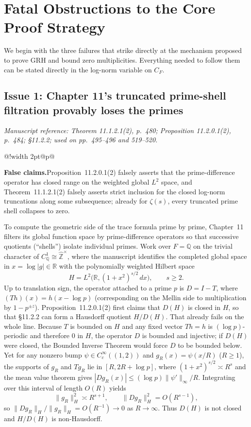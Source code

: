 \documentclass[11pt,letterpaper]{article}
\makeatletter
\newcommand{\msloc}[1]{%
  {\small\color{locgray}\itshape Manuscript reference: #1.}\par\nobreak\vspace{3pt}\@afterindentfalse\@afterheading
}
\newcommand{\issuefinding}[2]{%
  \begingroup
  \setlength{\fboxsep}{0pt}%
  \noindent\colorbox{barbg}{%
    \begin{tabular}{@{}!{\color{baraccent}\vrule width 2pt}@{\hspace{8pt}}p{\dimexpr\linewidth-18pt\relax}@{\hspace{8pt}}}
      \rule{0pt}{11.5pt}\small\textbf{\color{baraccent}#1}\enspace #2\rule[-4.5pt]{0pt}{0pt}
    \end{tabular}%
  }%
  \endgroup
  \par\nobreak\vspace{4.5pt}\@afterindentfalse\@afterheading
}
\newcommand{\Q}{\mathbb{Q}}
\newcommand{\R}{\mathbb{R}}
\newcommand{\Z}{\mathbb{Z}}
\newcommand{\Zhat}{\widehat{\Z}}
\newcommand{\dd}{\,d}
\makeatother
\begin{document}
\section{Fatal Obstructions to the Core Proof Strategy}
\label{sec:fatal}

We begin with the three failures that strike directly at the mechanism proposed to prove GRH and bound zero multiplicities. Everything needed to follow them can be stated directly in the log-norm variable on $C_F$.

\subsection{Issue 1: Chapter 11's truncated prime-shell filtration provably loses the primes}
\msloc{Theorem 11.1.2.1(2), p.~480; Proposition 11.2.0.1(2), p.~484; \S11.2.2; used on pp.~495--496 and 519--520}
\issuefinding{False claims.}{Proposition~11.2.0.1(2) falsely asserts that the prime-difference operator has closed range on the weighted global $L^2$ space, and Theorem~11.1.2.1(2) falsely asserts strict inclusion for the closed log-norm truncations along some subsequence; already for $\zeta(s)$, every truncated prime shell collapses to zero.}

To compute the geometric side of the trace formula prime by prime, Chapter~11 filters its global function space by prime-difference operators so that successive quotients (``shells'') isolate individual primes. Work over $F=\Q$ on the trivial character of $C_\Q^1\cong\Zhat^\times$, where the manuscript identifies the completed global space in $x=\log|g|\in\R$ with the polynomially weighted Hilbert space
\[
  H = L^2\bigl(\R, (1+x^2)^{s/2}\dd x\bigr), \qquad s\ge 2.
\]
Up to translation sign, the operator attached to a prime $p$ is $D = I - T$, where $(Th)(x) = h(x - \log p)$ (corresponding on the Mellin side to multiplication by $1 - p^{\pm z}$). Proposition~11.2.0.1(2) first claims that $D(H)$ is closed in $H$, so that \S11.2.2 can form a Hausdorff quotient $H/D(H)$. That already fails on the whole line. Because $T$ is bounded on $H$ and any fixed vector $Th=h$ is $(\log p)$-periodic and therefore $0$ in $H$, the operator $D$ is bounded and injective; if $D(H)$ were closed, the Bounded Inverse Theorem would force $D$ to be bounded below. Yet for any nonzero bump $\psi\in C_c^\infty((1,2))$ and $g_R(x) = \psi(x/R)$ ($R\ge 1$), the supports of $g_R$ and $Tg_R$ lie in $[R, 2R+\log p]$, where $(1+x^2)^{s/2}\asymp R^s$ and the mean value theorem gives $|Dg_R(x)|\le (\log p)\|\psi'\|_\infty/R$. Integrating over this interval of length $O(R)$ yields
\[
  \|g_R\|_H^2 \asymp R^{s+1}, \qquad \|Dg_R\|_H^2 = O(R^{s-1}),
\]
so $\|Dg_R\|_H / \|g_R\|_H = O(R^{-1}) \to 0$ as $R\to\infty$. Thus $D(H)$ is not closed and $H/D(H)$ is non-Hausdorff.
\end{document}
